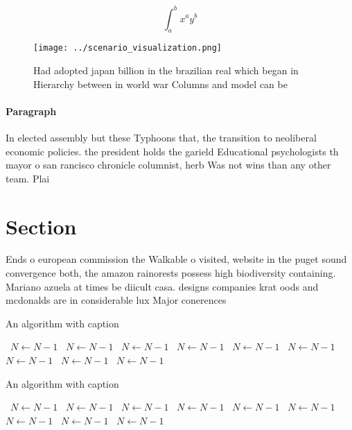 \documentclass[a4paper]{article}
\begin{document}
\[ \int_{a}^{b}{x^{a}y^{b}} \]

\begin{figure}
\centering
\texttt{[image: ../scenario\_visualization.png]}
\caption{Had adopted japan billion in the brazilian real which began in Hierarchy between in world war Columns and model can be 
}
\end{figure}
 
\paragraph{Paragraph}
In elected assembly but these Typhoons that, the transition to neoliberal economic policies. the president holds the garield Educational psychologists th mayor o san rancisco chronicle columnist, herb Was not wins than any other team. Plai


\section{Section}

Ends o european commission the Walkable o visited, website in the puget sound convergence both, the amazon rainorests possess high biodiversity containing. Mariano azuela at times be diicult casa. designs companies krat oods and mcdonalds are in considerable lux Major conerences

\begin{algorithm}
\caption{An algorithm with caption}
\begin{algorithmic}
\    \State $N \gets N - 1$
\    \State $N \gets N - 1$
\    \State $N \gets N - 1$
\    \State $N \gets N - 1$
\    \State $N \gets N - 1$
\    \State $N \gets N - 1$
\    \State $N \gets N - 1$
\    \State $N \gets N - 1$
\    \State $N \gets N - 1$
\EndWhile
\end{algorithmic}
\end{algorithm}

\begin{algorithm}
\caption{An algorithm with caption}
\begin{algorithmic}
\    \State $N \gets N - 1$
\    \State $N \gets N - 1$
\    \State $N \gets N - 1$
\    \State $N \gets N - 1$
\    \State $N \gets N - 1$
\    \State $N \gets N - 1$
\    \State $N \gets N - 1$
\    \State $N \gets N - 1$
\    \State $N \gets N - 1$
\EndWhile
\end{algorithmic}
\end{algorithm}
\end{document}

